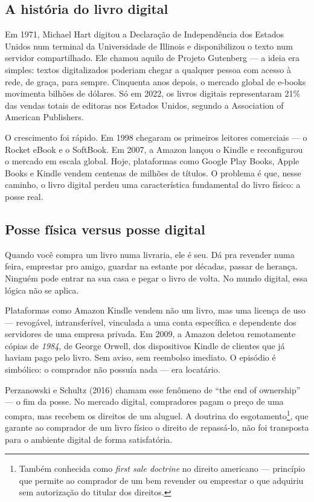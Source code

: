 \documentclass[12pt]{article}
\begin{document}
\subsection*{A história do livro digital}

Em 1971, Michael Hart digitou a Declaração de Independência dos Estados Unidos num terminal da Universidade de Illinois e disponibilizou o texto num servidor compartilhado. Ele chamou aquilo de Projeto Gutenberg — a ideia era simples: textos digitalizados poderiam chegar a qualquer pessoa com acesso à rede, de graça, para sempre. Cinquenta anos depois, o mercado global de e-books movimenta bilhões de dólares. Só em 2022, os livros digitais representaram 21\% das vendas totais de editoras nos Estados Unidos, segundo a Association of American Publishers.

O crescimento foi rápido. Em 1998 chegaram os primeiros leitores comerciais — o Rocket eBook e o SoftBook. Em 2007, a Amazon lançou o Kindle e reconfigurou o mercado em escala global. Hoje, plataformas como Google Play Books, Apple Books e Kindle vendem centenas de milhões de títulos. O problema é que, nesse caminho, o livro digital perdeu uma característica fundamental do livro físico: a posse real.

\subsection*{Posse física versus posse digital}

Quando você compra um livro numa livraria, ele é seu. Dá pra revender numa feira, emprestar pro amigo, guardar na estante por décadas, passar de herança. Ninguém pode entrar na sua casa e pegar o livro de volta. No mundo digital, essa lógica não se aplica.

Plataformas como Amazon Kindle vendem não um livro, mas uma licença de uso — revogável, intransferível, vinculada a uma conta específica e dependente dos servidores de uma empresa privada. Em 2009, a Amazon deletou remotamente cópias de \textit{1984}, de George Orwell, dos dispositivos Kindle de clientes que já haviam pago pelo livro. Sem aviso, sem reembolso imediato. O episódio é simbólico: o comprador não possuía nada — era locatário.

Perzanowski e Schultz (2016) chamam esse fenômeno de ``the end of ownership'' — o fim da posse. No mercado digital, compradores pagam o preço de uma compra, mas recebem os direitos de um aluguel. A doutrina do esgotamento\footnote{Também conhecida como \textit{first sale doctrine} no direito americano — princípio que permite ao comprador de um bem revender ou emprestar o que adquiriu sem autorização do titular dos direitos.}, que garante ao comprador de um livro físico o direito de repassá-lo, não foi transposta para o ambiente digital de forma satisfatória.
\end{document}
